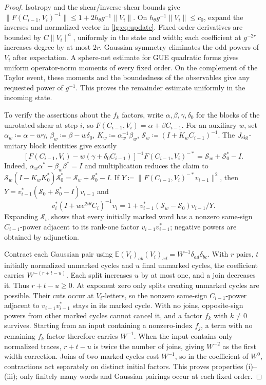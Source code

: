 \documentclass[11pt]{article}
\numberwithin{equation}{section}
\theoremstyle{remark}
\newcommand{\E}{\mathbb E}
\begin{document}
\begin{proof}
Isotropy and the shear/inverse-shear bounds give
$\|F(C_{i-1},V_i)^{-1}\|\le1+2h_\theta g^{-1}\|V_i\|$.
On $h_\theta g^{-1}\|V_i\|\le c_0$, expand the inverses and normalized vector
in \eqref{lg:eq:update}. Fixed-order derivatives are bounded by
$C\|V_i\|^a$, uniformly in the state and width; each coefficient at
$g^{-2r}$ increases degree by at most $2r$.
Gaussian symmetry eliminates the odd powers of $V_i$ after
expectation. A sphere-net estimate for GUE quadratic forms gives
uniform operator-norm moments of every fixed order. On the complement of the Taylor event, these moments and
the boundedness of the observables give any requested power of
$g^{-1}$. This proves the remainder estimate uniformly in the incoming state.

To verify the assertions about the $f_k$ factors, write $\alpha,\beta,\gamma,\delta_0$ for the blocks of the unrotated
shear at step $i$, so $F(C_{i-1},V_i)=\alpha+\beta C_{i-1}$.
For an auxiliary $w$, set
$\alpha_w\coloneqq \alpha-w\gamma$, $\beta_w\coloneqq \beta-w\delta_0$,
$K_w\coloneqq \alpha_w^{-1}\beta_w$,
$\mathcal S_w\coloneqq (I+K_wC_{i-1})^{-1}$.
The $J_{\rm sig}$-unitary block identities give exactly
\begin{equation}\label{lg:eq:poisson}
 [F(C_{i-1},V_i)-w(\gamma+\delta_0C_{i-1})]^{-1}
 F(C_{i-1},V_i)^{-*}=\mathcal S_w+\mathcal S_0^*-I.
\end{equation}
Indeed, $\alpha_w\alpha^*-\beta_w\beta^*=I$ and multiplication
reduces the claim to
$\mathcal S_w(I-K_wK_0^*)\mathcal S_0^*=\mathcal S_w+\mathcal S_0^*-I$.
If $Y\coloneqq\|F(C_{i-1},V_i)^{-*}v_{i-1}\|^2$, then
$Y=v_{i-1}^*(\mathcal S_0+\mathcal S_0^*-I)v_{i-1}$ and
\[
 v_i^*(I+we^{2i\theta}C_i)^{-1}v_i
   =1+v_{i-1}^*(\mathcal S_w-\mathcal S_0)v_{i-1}/Y.
\]
Expanding $\mathcal S_w$ shows that every initially marked word has a
nonzero same-sign $C_{i-1}$-power adjacent to its rank-one factor
$v_{i-1}v_{i-1}^*$;
negative powers are obtained by adjunction.

Contract each Gaussian pair using
$\E(V_i)_{ab}(V_i)_{cd}=W^{-1}\delta_{ad}\delta_{bc}$.
With $r$ pairs, $t$ initially normalized unmarked cycles and $u$
final unmarked cycles, the coefficient carries $W^{-(r+t-u)}$.
Each split increases $u$ by at most one, and a join decreases it.
Thus $r+t-u\ge0$. At exponent zero only splits creating unmarked
cycles are possible. Their cuts occur at $V_i$-letters, so the nonzero
same-sign $C_{i-1}$-power adjacent to $v_{i-1}v_{i-1}^*$ stays in its
marked cycle. With no joins, opposite-sign powers from other marked
cycles cannot cancel it, and a factor $f_k$ with $k\ne0$ survives.
Starting from an input
containing a nonzero-index $f_j$, a term with no remaining $f_k$
factor therefore carries $W^{-1}$. When the input contains only normalized traces,
$r+t-u$ is twice the number of joins, giving $W^{-2}$ as the first
width correction. Joins of two marked cycles cost $W^{-1}$, so
in the coefficient of $W^0$, contractions act separately on distinct
initial factors. This proves properties (i)--(iii); only finitely
many words and Gaussian pairings occur at each fixed order.
\end{proof}
\end{document}
